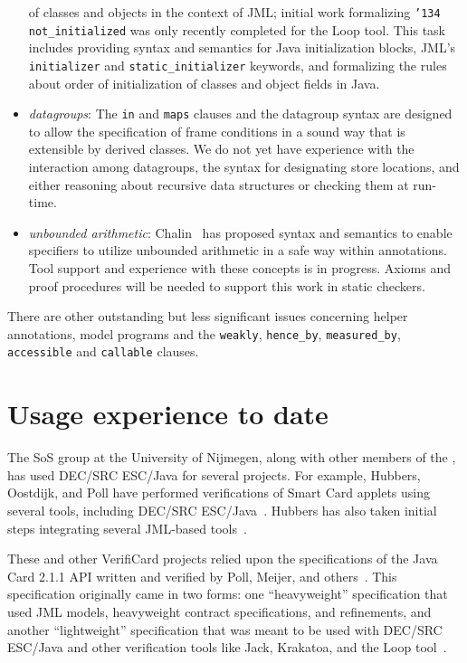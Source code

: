 \documentclass{sig-alternate}
\begin{document}
\begin{itemize}
of classes and objects in the context of JML; initial work formalizing
\texttt{\char'134 not\_initialized} was only recently completed for
the Loop tool.  This task includes providing syntax and semantics for
Java initialization blocks, JML's  \texttt{initializer} and \texttt{static\_initializer} keywords, and formalizing the rules about order of initialization of classes and object fields in Java.
\item \textit{datagroups}:  The \texttt{in} and \texttt{maps} clauses and the datagroup syntax are designed
to allow the specification of frame conditions in a sound way that is extensible by derived classes. 
We do not yet have experience with the interaction among datagroups, the syntax for designating store locations, and either reasoning about recursive data structures or checking them at 
run-time.
\item \textit{unbounded
  arithmetic}:  Chalin~\cite{Chalin03} has proposed syntax and semantics to enable specifiers to utilize unbounded arithmetic in a safe way within annotations.  Tool support and experience with
these concepts is in progress.  Axioms and proof procedures will be needed to support this work
in static checkers.
\end{itemize}
There are other outstanding but less significant issues concerning helper annotations, 
model programs and the \texttt{weakly}, \texttt{hence\_by}, \texttt{measured\_by},
\texttt{accessible} and \texttt{callable} clauses. 

\section{Usage experience to date}
\label{sec:usage-exper-date}
The SoS group at the University of Nijmegen, along with other members
of the , 
has used DEC/SRC ESC/Java for several projects.  For
example, Hubbers, Oostdijk, and Poll have performed verifications of
Smart Card applets using several tools, including DEC/SRC
ESC/Java~\cite{HOP04}.  Hubbers has also taken initial steps
integrating several JML-based tools~\cite{Hub03}.

These and other VerifiCard projects relied upon the specifications of
the Java Card 2.1.1 API written and verified by Poll, Meijer, and
others~\cite{MeijerPoll01}.  This specification originally came in two
forms: one ``heavyweight'' specification that used JML models,
heavyweight contract specifications, and refinements, and another
``lightweight'' specification that was meant to be used with DEC/SRC
ESC/Java and other verification tools like Jack, Krakatoa, and the
Loop tool~\cite{BergJ01,BurdyRequet02,MarchePaulinMohringUrbain04}.
\end{document}
